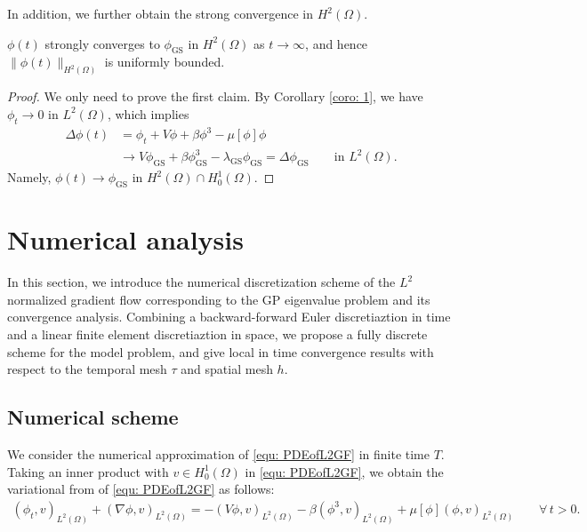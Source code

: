 \documentclass{siamart250211}
\begin{document}
In addition, we further obtain the strong convergence in $H^2(\Omega)$.
\begin{theorem}
	$\phi(t)$ strongly converges to $\phi_{\text{GS}}$ in $H^2(\Omega)$ as $t \to \infty$, and hence $\|\phi(t)\|_{H^2(\Omega)}$ is uniformly bounded.
\end{theorem}
\begin{proof}
	We only need to prove the first claim. By Corollary \ref{coro: 1}, we have $\phi_t \to 0$ in $L^2(\Omega)$, which implies 
	\begin{align*}
		\Delta \phi(t) & = \phi_t + V \phi + \beta \phi^3 - \mu[\phi] \phi \\
		& \to V \phi_{\text{GS}} + \beta \phi_{\text{GS}}^3 - \lambda_{\text{GS}} \phi_{\text{GS}} = \Delta \phi_{\text{GS}} \qquad \text{in $L^2(\Omega)$}.
	\end{align*}
	Namely, $\phi(t) \to \phi_{\text{GS}}$ in $H^2(\Omega) \cap H_0^1(\Omega)$.
\end{proof}

\section{Numerical analysis}\label{sec: Numerical analysis}

In this section, we introduce the numerical discretization scheme of the $L^2$ normalized gradient flow corresponding to the GP eigenvalue problem and its convergence analysis. Combining a backward-forward Euler discretiaztion in time and a linear finite element discretiaztion in space, we propose a fully discrete scheme for the model problem, and give local in time convergence results with respect to the temporal mesh $\tau$ and spatial mesh $h$. 

\subsection{Numerical scheme}

We consider the numerical approximation of \eqref{equ: PDEofL2GF} in finite time $T$. Taking an inner product with $v \in H_0^1(\Omega)$ in \eqref{equ: PDEofL2GF}, we obtain the variational from of \eqref{equ: PDEofL2GF} as follows:
\begin{align}\label{equ: variational form}
    (\phi_t,v)_{L^2(\Omega)} + (\nabla\phi,v )_{L^2(\Omega)}   = - (V\phi,v)_{L^2(\Omega)} - \beta (\phi^3,v)_{L^2(\Omega)} + \mu[\phi](\phi,v)_{L^2(\Omega)} \qquad \forall\,  t > 0.
\end{align}
\end{document}
